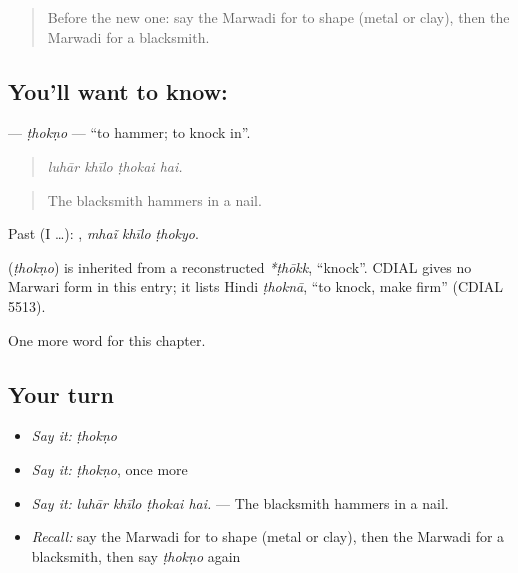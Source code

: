 \label{lesson:MW-C264-thokno}



\begin{quote}
Before the new one: say the Marwadi for to shape (metal or clay), then the Marwadi for a blacksmith.
\end{quote}

\subsection*{You'll want to know: }
\textbf{} — \emph{ṭhokṇo} — \textquotedblleft{}to hammer; to knock in\textquotedblright{}.

\begin{quote}
   
\end{quote}

\begin{quote}
\emph{luhār khīlo ṭhokai hai.}
\end{quote}

\begin{quote}
The blacksmith hammers in a nail.
\end{quote}

Past (I …):   , \emph{mhaĩ khīlo ṭhokyo}.

\begin{cousinweb}
\textbf{} (\emph{ṭhokṇo}) is inherited from a reconstructed \emph{*ṭhōkk}, \textquotedblleft{}knock\textquotedblright{}. CDIAL gives no Marwari form in this entry; it lists Hindi \emph{ṭhoknā}, \textquotedblleft{}to knock, make firm\textquotedblright{} (CDIAL 5513).
\end{cousinweb}

\begin{grammarlens}[title={What you've built}]
One more word for this chapter.
\end{grammarlens}

\subsection*{Your turn}
\begin{itemize}
\raggedright
  \item \emph{Say it:} \emph{ṭhokṇo}
  \item \emph{Say it:} \emph{ṭhokṇo}, once more
  \item \emph{Say it:} \emph{luhār khīlo ṭhokai hai.} — The blacksmith hammers in a nail.
  \item \emph{Recall:} say the Marwadi for to shape (metal or clay), then the Marwadi for a blacksmith, then say \emph{ṭhokṇo} again
\end{itemize}


